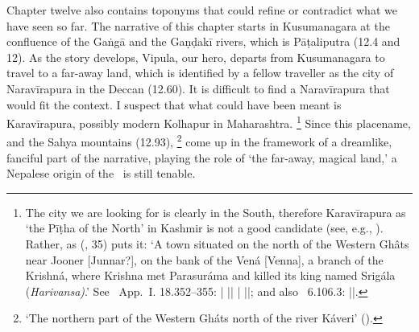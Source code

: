 Chapter twelve also contains toponyms that could
 refine or contradict what we have seen so far.
 The narrative of this chapter starts in Kusumanagara
 at the confluence of the Gaṅgā and the Gaṇḍakī rivers, 
 which is Pāṭali\-putra (12.4 and 12). As the story
 develops, Vipula, our hero, departs from Ku\-su\-ma\-na\-gara
 to travel to a far-away land, which is identified by a 
 fellow traveller as the city of Naravīrapura in the 
 Deccan (12.60).
 It is difficult to find a Naravīrapura that would fit
 the context. I suspect that what could have been meant
 is Karavīrapura, possibly modern Kolhapur
 in Maharashtra.%
	\footnote{The city we are looking for is clearly in
						the South, therefore Karavīrapura as
						`the Pīṭha of the North' in Kashmir is
						not a good candidate (see, e.g., 
						). Rather,
						as \citeauthor{DeyGeography} 
						(\citeyear{DeyGeography}, {35}) puts it:
						`A town situated on the north of the 
						Western Gh\^ats near Jooner [Junnar?], 
						on the bank of the Vená [Venna], 
						a branch of the Krishná,
						where Krishna met Parasuráma and
						killed its king named Srigála (\textit{Harivansa)}.'
						See \Harivamsa\ App.~I. 18.352--355:					
						 |
						 ||
						 |
						 ||;
					and also \PadmaP\ 6.106.3:
					     ||.} 
Since this placename, and 
the Sahya mountains (12.93),%
 	\footnote{`The northern part of the Western Gháts
north of the river Káveri' ().}
come up in the framework of a dreamlike, fanciful part of
the narrative, playing the role of `the far-away, magical
land,' a Nepalese origin of the \VSS\ is still tenable.
 
